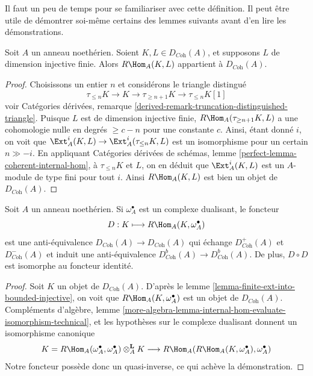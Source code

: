 \noindent
Il faut un peu de temps pour se familiariser avec cette définition.
Il peut être utile de démontrer soi-même certains des lemmes suivants
avant d'en lire les démonstrations.

\begin{lemma}
\label{lemma-finite-ext-into-bounded-injective}
Soit $A$ un anneau noethérien. Soient $K, L \in D_{\textit{Coh}}(A)$,
et supposons $L$ de dimension injective finie.
Alors $R\Hom_A(K, L)$ appartient à $D_{\textit{Coh}}(A)$.
\end{lemma}

\begin{proof}
Choisissons un entier $n$ et considérons le triangle distingué
$$
\tau_{\leq n}K \to K \to \tau_{\geq n + 1}K \to \tau_{\leq n}K[1]
$$
voir Catégories dérivées, remarque \ref{derived-remark-truncation-distinguished-triangle}.
Puisque $L$ est de dimension injective finie, $R\Hom_A(\tau_{\geq n + 1}K, L)$
a une cohomologie nulle en degrés $\geq c - n$ pour une constante $c$.
Ainsi, étant donné $i$, on voit que $\Ext^i_A(K, L) \to \Ext^i_A(\tau_{\leq n}K, L)$
est un isomorphisme pour un certain $n \gg - i$.
En appliquant Catégories dérivées de schémas, lemme \ref{perfect-lemma-coherent-internal-hom},
à $\tau_{\leq n}K$ et $L$, on en déduit que $\Ext^i_A(K, L)$
est un $A$-module de type fini pour tout $i$.
Ainsi $R\Hom_A(K, L)$ est bien un objet de $D_{\textit{Coh}}(A)$.
\end{proof}

\begin{lemma}
\label{lemma-dualizing}
Soit $A$ un anneau noethérien. Si $\omega_A^\bullet$ est un complexe dualisant,
le foncteur
$$
D : K \longmapsto R\Hom_A(K, \omega_A^\bullet)
$$
est une anti-équivalence $D_{\textit{Coh}}(A) \to D_{\textit{Coh}}(A)$
qui échange $D^+_{\textit{Coh}}(A)$ et $D^-_{\textit{Coh}}(A)$
et induit une anti-équivalence
$D^b_{\textit{Coh}}(A) \to D^b_{\textit{Coh}}(A)$.
De plus, $D \circ D$ est isomorphe au foncteur identité.
\end{lemma}

\begin{proof}
Soit $K$ un objet de $D_{\textit{Coh}}(A)$. D'après le lemme \ref{lemma-finite-ext-into-bounded-injective},
on voit que $R\Hom_A(K, \omega_A^\bullet)$ est un objet de $D_{\textit{Coh}}(A)$.
Compléments d'algèbre, lemme \ref{more-algebra-lemma-internal-hom-evaluate-isomorphism-technical},
et les hypothèses sur le complexe dualisant
donnent un isomorphisme canonique
$$
K = R\Hom_A(\omega_A^\bullet, \omega_A^\bullet) \otimes_A^\mathbf{L} K
\longrightarrow
R\Hom_A(R\Hom_A(K, \omega_A^\bullet), \omega_A^\bullet)
$$
Notre foncteur possède donc un quasi-inverse, ce qui achève la démonstration.
\end{proof}

